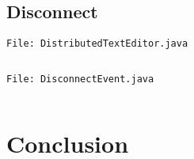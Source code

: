\documentclass[a4paper,draft,12pt,oneside,article,table]{memoir}
\newcommand{\srcpath}{../ex09/src/main/java/ddist}
\newcommand{\inmnt}[3]{\noindent\texttt{\color{gray}File: #3}\vspace{-1em}\inputminted[tabsize=4,firstline=#1,firstnumber=#1,lastline=#2,linenos]{java}{\srcpath/#3}}
\begin{document}
\section{Disconnect}
\inmnt{230}{240}{DistributedTextEditor.java}
\inmnt{1}{1000}{DisconnectEvent.java}


\chapter{Conclusion}

\end{document}
